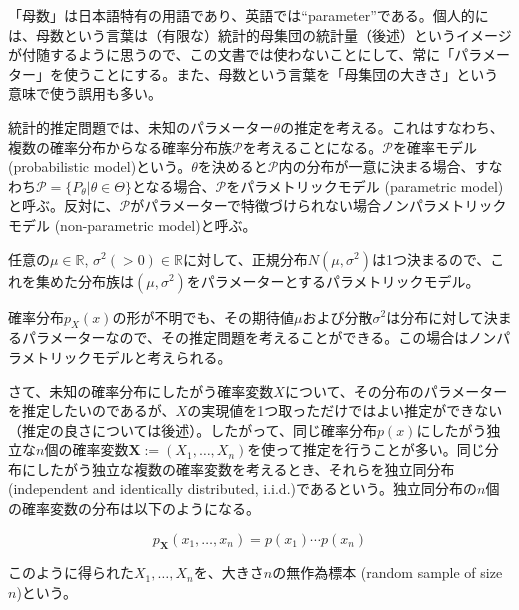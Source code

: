 \documentclass[uplatex,dvipdfmx]{jlreq}
\newcommand\term[1]{\textsf{#1}}
\begin{document}
\begin{note}
    「母数」は日本語特有の用語であり、英語では``parameter''である。個人的には、母数という言葉は（有限な）統計的母集団の統計量（後述）というイメージが付随するように思うので、この文書では使わないことにして、常に「パラメーター」を使うことにする。また、母数という言葉を「母集団の大きさ」という意味で使う誤用も多い。
\end{note}

統計的推定問題では、未知のパラメーター$\theta$の推定を考える。これはすなわち、複数の確率分布からなる確率分布族$\mathcal{P}$を考えることになる。$\mathcal{P}$を\term{確率モデル (probabilistic model)}という。$\theta$を決めると$\mathcal{P}$内の分布が一意に決まる場合、すなわち$\mathcal{P} = \{ P_\theta | \theta \in \Theta \}$となる場合、$\mathcal{P}$を\term{パラメトリックモデル (parametric model)}と呼ぶ。反対に、$\mathcal{P}$がパラメーターで特徴づけられない場合\term{ノンパラメトリックモデル (non-parametric model)}と呼ぶ。

\begin{example}
    任意の$\mu\in\mathbb{R}$, $\sigma^2(>0)\in\mathbb{R}$に対して、正規分布$N(\mu, \sigma^2)$は1つ決まるので、これを集めた分布族は$(\mu, \sigma^2)$をパラメーターとするパラメトリックモデル。
\end{example}

\begin{example}
    確率分布$p_X(x)$の形が不明でも、その期待値$\mu$および分散$\sigma^2$は分布に対して決まるパラメーターなので、その推定問題を考えることができる。この場合はノンパラメトリックモデルと考えられる。
\end{example}

さて、未知の確率分布にしたがう確率変数$X$について、その分布のパラメーターを推定したいのであるが、$X$の実現値を1つ取っただけではよい推定ができない（推定の良さについては後述）。したがって、同じ確率分布$p(x)$にしたがう独立な$n$個の確率変数$\boldsymbol{X} := (X_1, \dotsc, X_n)$を使って推定を行うことが多い。同じ分布にしたがう独立な複数の確率変数を考えるとき、それらを\term{独立同分布 (independent and identically distributed, i.i.d.)}であるという。独立同分布の$n$個の確率変数の分布は以下のようになる。

\begin{equation}
    p_{\boldsymbol{X}}(x_1, \dotsc, x_n) = p(x_1) \dotsm p(x_n)
\end{equation}

このように得られた$X_1, \dotsc, X_n$を、\term{大きさ$n$の無作為標本 (random sample of size $n$)}という。
\end{document}
